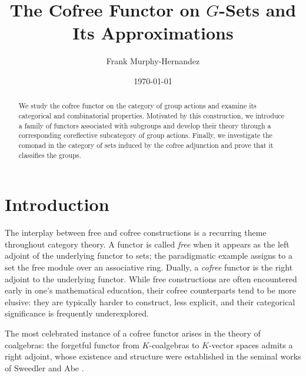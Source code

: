 \documentclass{amsart}
\begin{document}
\title{The Cofree Functor on $G$-Sets and Its Approximations}

\author{Frank Murphy-Hernandez}
\address{Facultad de Ciencias, UNAM, Mexico City}


\date{\today}


\begin{abstract}
We study the cofree functor on the category of group actions and examine its categorical and combinatorial properties. Motivated by this construction, we introduce a family of functors associated with subgroups and develop their theory through a corresponding coreflective subcategory of group actions. Finally, we investigate the comonad in the category of sets induced by the cofree adjunction and prove that it classifies the groups.
\end{abstract}

\maketitle

\section{Introduction}

The interplay between free and cofree constructions is a recurring theme throughout category theory. A functor is called \emph{free} when it appears as the left adjoint of the underlying functor to sets; the paradigmatic example assigns to a set the free module over an associative ring. Dually, a \emph{cofree} functor is the right adjoint to the underlying functor. While free constructions are often encountered early in one's mathematical education, their cofree counterparts tend to be more elusive: they are typically harder to construct, less explicit, and their categorical significance is frequently underexplored.

The most celebrated instance of a cofree functor arises in the theory of coalgebras: the forgetful functor from $K$-coalgebras to $K$-vector spaces admits a right adjoint, whose existence and structure were established in the seminal works of Sweedler \cite{Sweedler1969Hopf} and Abe \cite{Abe1980Hopf}. 
\end{document}

